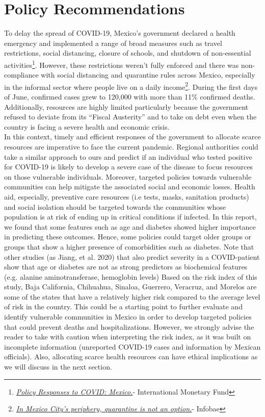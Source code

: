 \documentclass[hidelinks,10pt]{article}
\begin{document}
	\section{Policy Recommendations}\label{sec_pol}
	To delay the spread of COVID-19, Mexico’s government declared a health emergency and implemented a range of broad measures such as travel restrictions, social distancing, closure of schools, and shutdown of non-essential activities\footnote{\href{https://www.imf.org/en/Topics/imf-and-covid19/Policy-Responses-to-COVID-19\#M}{\textit{Policy Responses to COVID: Mexico.}}- International Monetary Fund}. However, these restrictions weren't fully enforced and there was non-compliance with social distancing and quarantine rules across Mexico, especially in the informal sector where people live on a daily income\footnote{\href{https://www.infobae.com/america/mexico/2020/04/19/en-la-periferia-de-ciudad-de-mexico-la-cuarentena-no-es-una-opcion/}{\textit{In Mexico City's periphery, quarantine is not an option.}}- Infobae}. During the first days of June, confirmed cases grew to 120,000 with more than 11\% confirmed deaths. Additionally, resources are highly limited particularly because the government refused to deviate from its “Fiscal Austerity” and to take on debt even when the country is facing a severe health and economic crisis.\\
	In this context, timely and efficient responses of the government to allocate scarce resources are imperative to face the current pandemic. Regional authorities could take a similar approach to ours and predict if an individual who tested positive for COVID-19 is likely to develop a severe case of the disease to focus resources on those vulnerable individuals. Moreover, targeted policies towards vulnerable communities can help mitigate the associated social and economic losses. Health aid, especially, preventive care resources (i.e tests, masks, sanitation products) and social isolation should be targeted towards the communities whose population is at risk of ending up in critical conditions if infected. In this report, we found that some features such as age and diabetes showed higher importance in predicting these outcomes. Hence, some policies could target older groups or groups that show a higher presence of comorbidities such as diabetes. Note that other studies (as Jiang, et al. 2020) that also predict severity in a COVID-patient show that age or diabetes are not as strong predictors as biochemical features (e.g. alanine aminotransferase, hemoglobin levels)
	Based on the risk index of this study, Baja California, Chihuahua, Sinaloa, Guerrero,  Veracruz, and Morelos are some of the states that have a relatively higher risk compared to the average level of risk in the country. This could be a starting point to further evaluate and identify vulnerable communities in Mexico in order to develop targeted policies that could prevent deaths and hospitalizations. However, we strongly advise the reader to take with caution when interpreting the risk index, as it was built on incomplete information (unreported COVID-19 cases and information by Mexican officials). Also, allocating scarce health resources can have ethical implications as we will discuss in the next section. 
	
\end{document}
